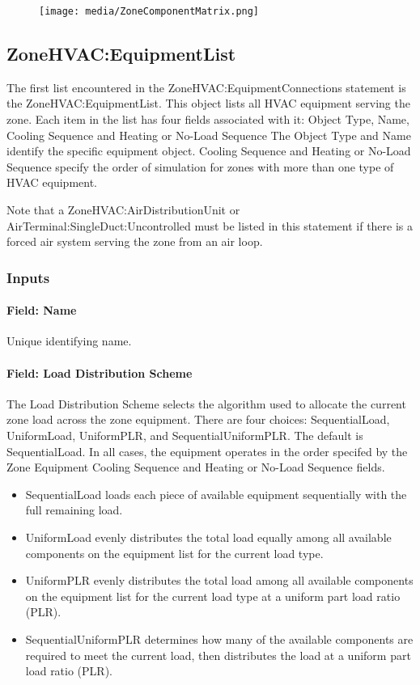 \begin{figure}[htbp]
\centering
\texttt{[image: media/ZoneComponentMatrix.png]}
\caption{}
\end{figure}

\subsection{ZoneHVAC:EquipmentList}\label{zonehvacequipmentlist}

The first list encountered in the ZoneHVAC:EquipmentConnections statement is the ZoneHVAC:EquipmentList. This object lists all HVAC equipment serving the zone. Each item in the list has four fields associated with it: Object Type, Name, Cooling Sequence and Heating or No-Load Sequence The Object Type and Name identify the specific equipment object. Cooling Sequence and Heating or No-Load Sequence specify the order of simulation for zones with more than one type of HVAC equipment.

Note that a ZoneHVAC:AirDistributionUnit or AirTerminal:SingleDuct:Uncontrolled must be listed in this statement if there is a forced air system serving the zone from an air loop.

\subsubsection{Inputs}\label{inputs-2-048}

\paragraph{Field: Name}\label{field-name-1-050}

Unique identifying name.

\paragraph{Field: Load Distribution Scheme}\label{field-load-distribution-scheme-000}

The Load Distribution Scheme selects the algorithm used to allocate the current zone load across the zone equipment. There are four choices: SequentialLoad, UniformLoad, UniformPLR, and SequentialUniformPLR. The default is SequentialLoad. In all cases, the equipment operates in the order specifed by the Zone Equipment Cooling Sequence and Heating or No-Load Sequence fields.

\begin{itemize}
\item
  SequentialLoad loads each piece of available equipment sequentially with the full remaining load. 
\item
  UniformLoad evenly distributes the total load equally among all available components on the equipment list for the current load type. 
\item
  UniformPLR evenly distributes the total load among all available components on the equipment list for the current load type at a uniform part load ratio (PLR). 
\item
  SequentialUniformPLR determines how many of the available components are required to meet the current load, then distributes the load at a uniform part load ratio (PLR).
\end{itemize}
